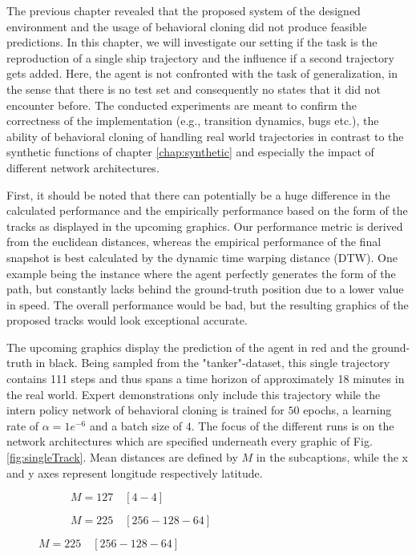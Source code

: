 The previous chapter revealed that the proposed system of the designed environment and the usage of behavioral cloning did not produce feasible predictions. In this chapter, we will investigate our setting if the task is the reproduction of a single ship trajectory and the influence if a second trajectory gets added. Here, the agent is not confronted with the task of generalization, in the sense that there is no test set and consequently no states that it did not encounter before. The conducted experiments are meant to confirm the correctness of the implementation (e.g., transition dynamics, bugs etc.), the ability of behavioral cloning of handling real world trajectories in contrast to the synthetic functions of chapter \ref{chap:synthetic} and especially the impact of different network architectures.
\par
First, it should be noted that there can potentially be a huge difference in the calculated performance and the empirically performance based on the form of the tracks as displayed in the upcoming graphics. Our performance metric is derived from the euclidean distances, whereas the empirical performance of the final snapshot is best calculated by the dynamic time warping distance (DTW). One example being the instance where the agent perfectly generates the form of the path, but constantly lacks behind the ground-truth position due to a lower value in speed. The overall performance would be bad, but the resulting graphics of the proposed tracks would look exceptional accurate.
\par
The upcoming graphics display the prediction of the agent in red and the ground-truth in black. Being sampled from the "tanker"-dataset, this single trajectory contains 111 steps and thus spans a time horizon of approximately 18 minutes in the real world. Expert demonstrations only include this trajectory while the intern policy network of behavioral cloning is trained for $50$ epochs, a learning rate of $\alpha = 1e^{-6}$ and a batch size of $4$. The focus of the different runs is on the network architectures which are specified underneath every graphic of Fig. \ref{fig:singleTrack}. Mean distances are defined by $M$ in the subcaptions, while the x and y axes represent longitude respectively latitude.
\begin{figure}[H]
     \centering
     \begin{subfigure}[b]{0.48\textwidth}
         \centering
       
         \caption{$M=127 \quad [4-4]$}
         \label{fig:single1}
     \end{subfigure}
     \hfill
     \begin{subfigure}[b]{0.48\textwidth}
         \centering
             
         \caption{$M=225 \quad [256-128-64]$}
         \label{fig:single2}
     \end{subfigure}
\end{figure}
